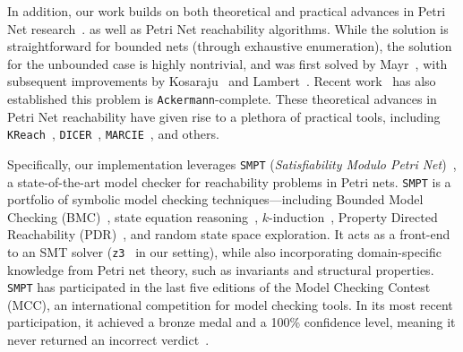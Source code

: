In addition, our work builds on both theoretical and practical advances in 
Petri Net research~\cite{Mu89, Es96, Re12, EsNi24}. 
%
as well as Petri Net reachability algorithms. While the solution is 
straightforward for bounded nets (through exhaustive enumeration), the solution 
for the unbounded case is highly nontrivial, and was first solved by 
Mayr~\cite{Ma81}, with subsequent improvements by Kosaraju~\cite{Ko82} and 
Lambert~\cite{La92}. Recent work~\cite{CzWo22} has also established this 
problem is \texttt{Ackermann}-complete.
%
These theoretical advances in Petri Net reachability have given rise to a 
plethora of practical tools, including \texttt{KReach}~\cite{DiLa20}, 
\texttt{DICER}~\cite{XiZhLi21}, \texttt{MARCIE}~\cite{HeRoSc13}, and others. 

Specifically, our implementation leverages \texttt{SMPT} (\emph{Satisfiability Modulo Petri Net})~\cite{AmDa23}, a state-of-the-art model checker for reachability problems in Petri nets. \texttt{SMPT} is a portfolio of symbolic model checking techniques—including Bounded Model Checking (BMC)~\cite{BiCiClZh99}, state equation reasoning~\cite{Mu77}, $k$-induction~\cite{ShSiSt20}, Property Directed Reachability (PDR)~\cite{Br11,AmDaHu22}, and random state space exploration. It acts as a front-end to an SMT solver (\texttt{z3}~\cite{DeBj08} in our setting), while also incorporating domain-specific knowledge from Petri net theory, such as invariants and structural properties. \texttt{SMPT} has participated in the last five editions of the Model Checking Contest (MCC), an international competition for model checking tools. In its most recent participation, it achieved a bronze medal and a 100\% confidence level, meaning it never returned an incorrect verdict~\cite{mcc:2025}.

